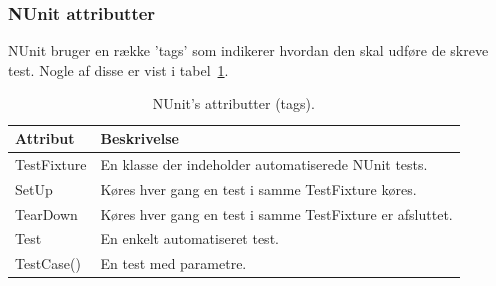 \subsubsection{NUnit attributter}
NUnit bruger en række 'tags' som indikerer hvordan den skal udføre de skreve test. Nogle af disse er vist i tabel~\ref{tab:nunit}.

\begin{table}[H]
	\centering
	\begin{tabular}{ll}
		\toprule
		\rowcolor{Black!5} \textbf{Attribut}& 	\textbf{Beskrivelse}\\ \midrule
		TestFixture	&	En klasse der indeholder automatiserede NUnit tests. \\
		SetUp		&	Køres hver gang en test i samme TestFixture køres.\\
		TearDown	&	Køres hver gang en test i samme TestFixture er afsluttet.\\
		Test		&	En enkelt automatiseret test.\\
		TestCase()	&	En test med parametre.\\ \bottomrule
	\end{tabular}
	\caption{NUnit's attributter (tags).}
	\label{tab:nunit}
\end{table}


